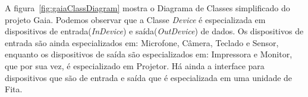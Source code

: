 A figura~\ref{fig:gaiaClassDiagram} mostra o Diagrama de Classes simplificado do projeto Gaia. Podemos observar que a Classe \emph{Device} é especializada em dispositivos de entrada(\emph{InDevice}) e saída(\emph{OutDevice}) de dados. Os dispositivos de entrada são ainda especializados em: Microfone, Câmera, Teclado e Sensor, enquanto os dispositivos de saída são especializados em: Impressora e Monitor, que por sua vez, é especializado em Projetor. Há ainda a interface para dispositivos que são de entrada e saída que é especializada em uma unidade de Fita.

